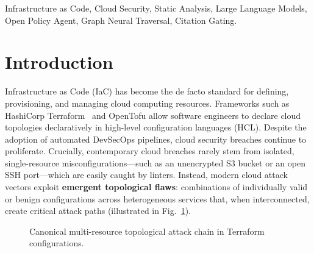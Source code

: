 \documentclass[conference]{IEEEtran}
\begin{document}
\begin{IEEEkeywords}
Infrastructure as Code, Cloud Security, Static Analysis, Large Language Models, Open Policy Agent, Graph Neural Traversal, Citation Gating.
\end{IEEEkeywords}

\section{Introduction}

Infrastructure as Code (IaC) has become the de facto standard for defining, provisioning, and managing cloud computing resources. Frameworks such as HashiCorp Terraform~\cite{hashicorp_terraform} and OpenTofu allow software engineers to declare cloud topologies declaratively in high-level configuration languages (HCL). Despite the adoption of automated DevSecOps pipelines, cloud security breaches continue to proliferate. Crucially, contemporary cloud breaches rarely stem from isolated, single-resource misconfigurations---such as an unencrypted S3 bucket or an open SSH port---which are easily caught by linters. Instead, modern cloud attack vectors exploit \textbf{emergent topological flaws}: combinations of individually valid or benign configurations across heterogeneous services that, when interconnected, create critical attack paths (illustrated in Fig.~\ref{fig:attack_chain}).

\begin{figure}[htbp]
\centering
{}
\caption{Canonical multi-resource topological attack chain in Terraform configurations.}
\label{fig:attack_chain}
\end{figure}
\end{document}

